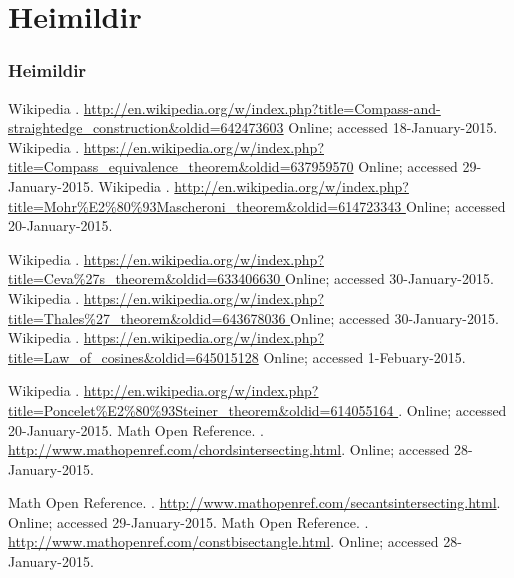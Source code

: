 \section{Heimildir}
\begin{frame}[allowframebreaks]

  \frametitle<presentation>{Heimildir} 
  
  \begin{thebibliography}{10}    
  \beamertemplateonlinebibitems
     Wikipedia
     .
     \newblock \url{http://en.wikipedia.org/w/index.php?title=Compass-and-straightedge_construction&oldid=642473603}
     \newblock Online; accessed 18-January-2015.
     Wikipedia
     .
     \newblock \url{https://en.wikipedia.org/w/index.php?title=Compass_equivalence_theorem&oldid=637959570}
     \newblock Online; accessed 29-January-2015.
     Wikipedia
     .
     \newblock \url{http://en.wikipedia.org/w/index.php?title=Mohr%
     }
     \newblock Online; accessed 20-January-2015.

     Wikipedia
     .
     \newblock \url{https://en.wikipedia.org/w/index.php?title=Ceva%
     }
     \newblock Online; accessed 30-January-2015.
     Wikipedia
     .
     \newblock \url{https://en.wikipedia.org/w/index.php?title=Thales%
     }
     \newblock Online; accessed 30-January-2015.
     Wikipedia
     .
     \newblock \url{https://en.wikipedia.org/w/index.php?title=Law_of_cosines&oldid=645015128}
     \newblock Online; accessed 1-Febuary-2015.
     
     Wikipedia
     .
     \newblock  \url{http://en.wikipedia.org/w/index.php?title=Poncelet%
     }.
     \newblock Online; accessed 20-January-2015.
     Math Open Reference.
     .
     \newblock \url{http://www.mathopenref.com/chordsintersecting.html}.
     \newblock Online; accessed 28-January-2015.

     Math Open Reference.
     .
     \newblock \url{http://www.mathopenref.com/secantsintersecting.html}.
     \newblock Online; accessed 29-January-2015.
     Math Open Reference.
     .
     \newblock \url{http://www.mathopenref.com/constbisectangle.html}.
     \newblock Online; accessed 28-January-2015.
     

\end{thebibliography}
\end{frame}
